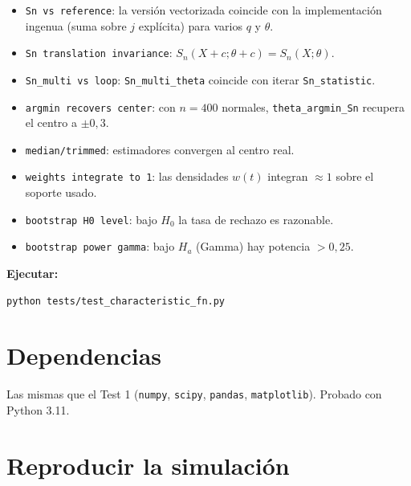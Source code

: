 \documentclass[11pt,a4paper]{article}
\begin{document}
\begin{itemize}[leftmargin=*]
    \item \texttt{Sn vs reference}: la versión vectorizada coincide con
    la implementación ingenua (suma sobre $j$ explícita) para varios $q$ y $\theta$.
    \item \texttt{Sn translation invariance}: $S_n(X+c;\theta+c)=S_n(X;\theta)$.
    \item \texttt{Sn\_multi vs loop}: \texttt{Sn\_multi\_theta} coincide con
    iterar \texttt{Sn\_statistic}.
    \item \texttt{argmin recovers center}: con $n=400$ normales,
    \texttt{theta\_argmin\_Sn} recupera el centro a $\pm 0{,}3$.
    \item \texttt{median/trimmed}: estimadores convergen al centro real.
    \item \texttt{weights integrate to 1}: las densidades $w(t)$ integran $\approx 1$
    sobre el soporte usado.
    \item \texttt{bootstrap H0 level}: bajo $H_0$ la tasa de rechazo es razonable.
    \item \texttt{bootstrap power gamma}: bajo $H_a$ (Gamma) hay potencia $>0{,}25$.
\end{itemize}

\textbf{Ejecutar:}
\begin{lstlisting}[style=shellstyle]
python tests/test_characteristic_fn.py
\end{lstlisting}

\section{Dependencias}

Las mismas que el Test 1 (\texttt{numpy}, \texttt{scipy}, \texttt{pandas},
\texttt{matplotlib}). Probado con Python 3.11.

\section{Reproducir la simulación}
\end{document}
